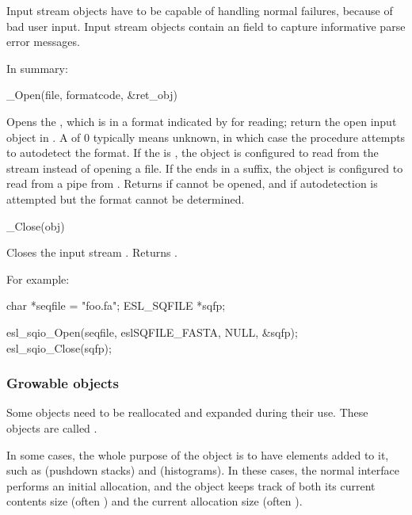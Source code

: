 Input stream objects have to be capable of handling normal failures,
because of bad user input. Input stream objects contain an
 field to capture informative parse error
messages. 

In summary:

\begin{sreapi}
\hypertarget{ifc:Open} 
{\item[\_Open(file, formatcode, \&ret\_obj)]}

Opens the , which is in a format indicated by
 for reading; return the open input object in
. A  of 0 typically means unknown,
in which case the  procedure attempts to autodetect
the format. If the  is , the object is
configured to read from the  stream instead of opening a
file. If the  ends in a  suffix, the object is
configured to read from a pipe from . Returns
 if  cannot be opened, and
 if autodetection is attempted but the format cannot
be determined.

\hypertarget{ifc:Close} 
{\item[\_Close(obj)]}

Closes the input stream . Returns .
\end{sreapi}


For example:

\begin{cchunk}
    char        *seqfile = "foo.fa";
    ESL_SQFILE  *sqfp;

    esl_sqio_Open(seqfile, eslSQFILE_FASTA, NULL, &sqfp);
    esl_sqio_Close(sqfp);
\end{cchunk}



\subsubsection{Growable objects}

Some objects need to be reallocated and expanded during their use.
These objects are called .

In some cases, the whole purpose of the object is to have elements
added to it, such as  (pushdown stacks) and
 (histograms). In these cases, the normal
 interface performs an initial allocation, and the
object keeps track of both its current contents size (often
) and the current allocation size (often
). 

